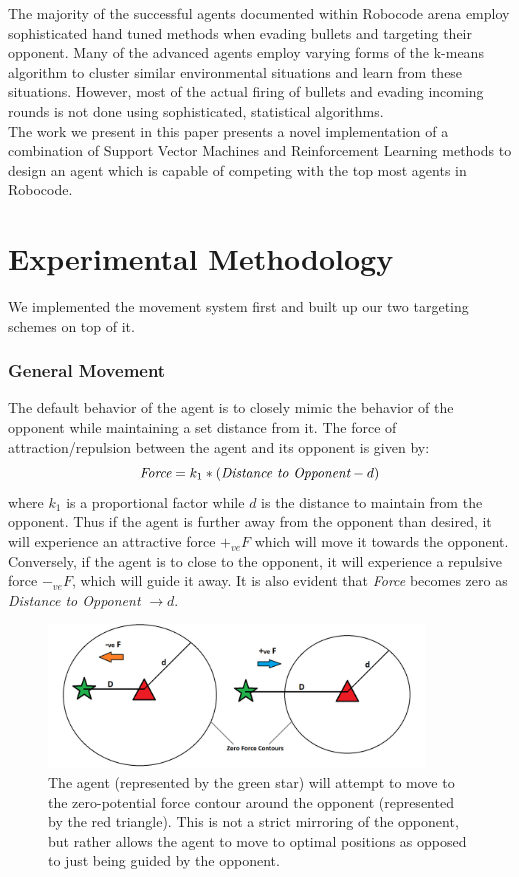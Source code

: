 \documentclass{article}
\theoremstyle{plain}
\theoremstyle{definition}
\theoremstyle{remark}
\begin{document}
The majority of the successful agents documented within Robocode arena employ sophisticated hand tuned methods when evading bullets and targeting their opponent. Many of the advanced agents employ varying forms of the k-means algorithm to cluster similar environmental situations and learn from these situations. However, most of the actual firing of bullets and evading incoming rounds is not done using sophisticated, statistical algorithms. \\


The work we present in this paper presents a novel implementation of a combination of Support Vector Machines and Reinforcement Learning methods to design an agent which is capable of competing with the top most agents in Robocode.

\section{Experimental Methodology}
We implemented the movement system first and built up our two targeting schemes on top of it.

\subsubsection*{General Movement}
The default behavior of the agent is to closely mimic the behavior of the opponent while maintaining a set distance from it. The force of attraction/repulsion between the agent and its opponent is given by:
$$\emph{Force} = k_1 * (\emph{Distance to Opponent} - d)$$
where $k_1$ is a proportional factor while $d$ is the distance to maintain from the opponent. Thus if the agent is further away from the opponent than desired, it will experience an attractive force $+_{ve}F$ which will move it towards the opponent. Conversely, if the agent is to close to the opponent, it will experience a repulsive force $-_{ve}F$, which will guide it away. It is also evident that \emph{Force} becomes zero as \emph{Distance to Opponent}  $\rightarrow d$.\\ 

\begin{figure}[h]
	\centering
		\includegraphics[width= 10cm]{mirror}
		\caption{The agent (represented by the green star) will attempt to move to the zero-potential force contour around the opponent (represented by the red triangle). This is not a strict mirroring of the opponent, but rather allows the agent to move to optimal positions as opposed to just being guided by the opponent.}		
	\label{mirror}
\end{figure}
\end{document}
